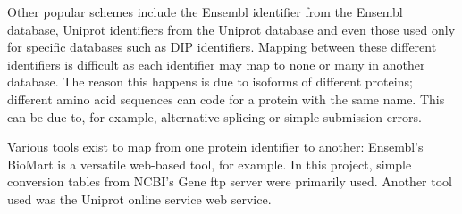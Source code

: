 Other popular schemes include the Ensembl identifier from the Ensembl database\autocite{hubbard_ensembl_2002}, Uniprot identifiers from the Uniprot database\autocite{consortium_universal_2008} and even those used only for specific databases such as \ac{DIP} identifiers\autocite{xenarios_dip_2002}.
Mapping between these different identifiers is difficult as each identifier may map to none or many in another database.
The reason this happens is due to isoforms of different proteins; different amino acid sequences can code for a protein with the same name.
This can be due to, for example, alternative splicing\autocite{black_mechanisms_2003} or simple submission errors\autocite{zeeberg_mistaken_2004}.

Various tools exist to map from one protein identifier to another: Ensembl's BioMart\autocite{smedley_biomart_2009} is a versatile web-based tool, for example.
In this project, simple conversion tables from NCBI's Gene\autocite{maglott_entrez_2007} ftp server were primarily used.
Another tool used was the Uniprot\autocite{consortium_universal_2008} online service web service.

